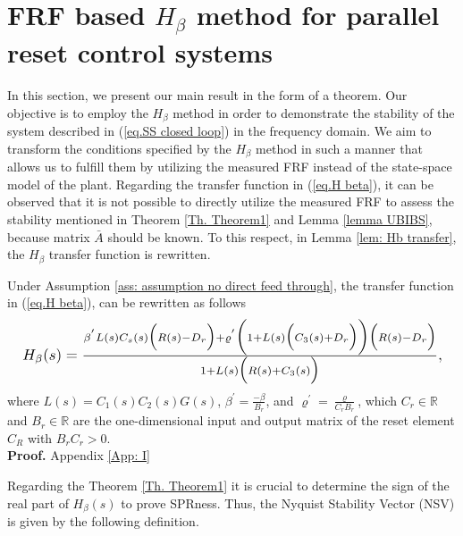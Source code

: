 \section{FRF based $H_\beta$ method for parallel reset control systems } \label{sec: main results}
In this section, we present our main result in the form of a theorem. Our objective is to employ the $H_\beta$ method in order to demonstrate the stability of the system described in (\ref{eq.SS closed loop}) in the frequency domain. We aim to transform the conditions specified by the $H_\beta$ method in such a manner that allows us to fulfill them by utilizing the measured FRF instead of the state-space model of the plant.
Regarding the transfer function in (\ref{eq.H beta}), it can be observed that it is not possible to directly utilize the measured FRF to assess the stability mentioned in Theorem \ref{Th. Theorem1} and Lemma \ref{lemma UBIBS}, because matrix $\bar{A}$ should be known. To this respect, in Lemma \ref{lem: Hb transfer}, the $H_\beta$ transfer function is rewritten.\\

\begin{lemma}
\label{lem: Hb transfer}
    Under Assumption \ref{ass: assumption no direct feed through}, the transfer function in (\ref{eq.H beta}), can be rewritten as follows
    \begin{equation}
    \label{eq: H_b FRF}
    \resizebox{1\hsize}{!}{
    $H_\beta(s)=\frac{\beta^{'}L(s)C_s(s)\Big(R(s)-D_r\Big)+\varrho^{'}\bigg(1+L(s)\Big(C_3(s)+D_r\Big)\bigg)\Bigl(R(s)-D_r\Bigl)}{1+L(s)\Bigl(R(s)+C_3(s)\Bigl)},$
    }
    \end{equation}
    where $L(s)=C_1(s)C_2(s)G(s)$, $\beta^{'}=\frac{-\beta}{B_r}$, and $\varrho^{'}=\frac{\varrho}{C_r B_r}$, which $C_r \in \mathbb{R}$ and $B_r \in \mathbb{R}$ are the one-dimensional input and output matrix of the reset element $C_R$ with $B_r C_r >0$.\\
    \textbf{ Proof.} Appendix \ref{App: I}\\
\end{lemma}

Regarding the Theorem \ref{Th. Theorem1} it is crucial to determine the sign of the real part of $H_\beta(s)$ to prove SPRness. Thus, the Nyquist Stability Vector (NSV) is given by the following definition.\\

